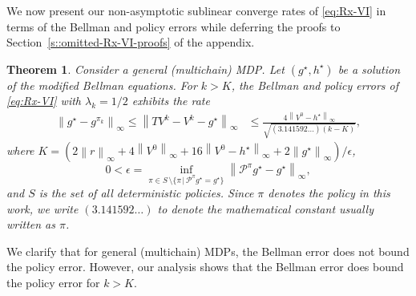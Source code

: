 \documentclass{article} %
\newcommand{\cA}{\mathcal{A}}
\newcommand{\cS}{\mathcal{S}}
\newcommand{\cP}{\mathcal{P}}
\newcommand*{\para}[1]{\left({#1}\right)}
\newcommand*{\infn}[1]{\left\|{#1}\right\|_{\infty}}
\newtheorem{theorem}{Theorem}
\begin{document}
We now present our non-asymptotic sublinear converge rates of \ref{eq:Rx-VI} in terms of the Bellman and policy errors while deferring the proofs to Section~\ref{s::omitted-Rx-VI-proofs} of the appendix. 



\begin{theorem}\label{thm:KMm_optimized}
Consider a general (multichain) MDP.
Let $(g^{\star},h^{\star})$ be a solution of the modified Bellman equations.
For $k>K$, the Bellman and policy errors of \ref{eq:Rx-VI} with $\lambda_k=1/2$ exhibits the rate
  \begin{align*}
  \infn{g^{\star}-g^{\pi_k}} \le \infn{TV^k-V^k-g^{\star}} &\le   \frac{4\infn{V^0-h^{\star}}}{\sqrt{(3.141592\dots)(k-K)}},
  \end{align*}
  where 
  $K=\para{2\infn{r}+4\infn{V^0}+16\infn{V^0-h^{\star}} +2\infn{g^{\star}}}  /\epsilon$,
  \[0<\epsilon=\inf_{\pi \in S \, \setminus \{\pi \,|\, \cP^{\pi}g^{\star} =  g^{\star}\}} \infn{\cP^{\pi}g^{\star}-g^{\star}},
  \] and $S$ is the set of all deterministic policies. Since $\pi$ denotes the policy in this work, we write $(3.141592\dots)$ to denote the mathematical constant usually written as $\pi$.
\end{theorem}

We clarify that for general (multichain) MDPs, the Bellman error does not bound the policy error. However, our analysis shows that the Bellman error does bound the policy error for $k>K$.
\end{document}
